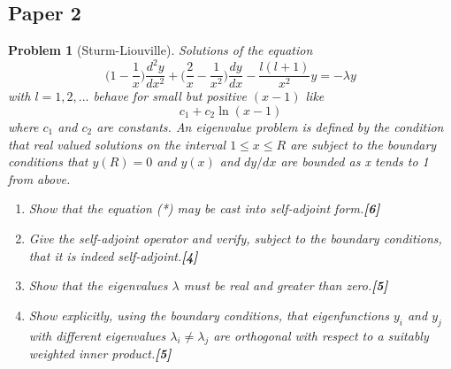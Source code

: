 \documentclass[a4paper]{article}
\theoremstyle{new}
\newtheorem{qns}{Problem}[section]
\begin{document}
\subsection{Paper 2}
\begin{qns}[Sturm-Liouville]
Solutions of the equation
\begin{equation}
    \bigg(1-\frac{1}{x}\bigg)\frac{d^2y}{dx^2}+\bigg(\frac{2}{x}-\frac{1}{x^2}\bigg)\frac{dy}{dx}-\frac{l(l+1)}{x^2}y=-\lambda y\tag{*}
\end{equation}
with $l = 1, 2, . . .$ behave for small but positive $(x − 1)$ like
$$c_1 + c_2\ln(x − 1)$$
where $c_1$ and $c_2$ are constants. An eigenvalue problem is defined by the condition that real valued solutions on the interval $1\leq x\leq R$ are subject to the boundary conditions that $y(R) = 0$ and $y(x)$ and $dy/dx$ are bounded as x tends to 1 from above.
\begin{enumerate}[label=(\roman*)]
    \item Show that the equation (*) may be cast into self-adjoint form.\hfill\textbf{[6]}
    \item Give the self-adjoint operator and verify, subject to the boundary conditions, that it is indeed self-adjoint.\hfill\textbf{[4]}
    \item Show that the eigenvalues $\lambda$ must be real and greater than zero.\hfill\textbf{[5]}
    \item Show explicitly, using the boundary conditions, that eigenfunctions $y_i$ and $y_j$ with different eigenvalues $\lambda_i\neq\lambda_j$ are orthogonal with respect to a suitably weighted inner product.\hfill\textbf{[5]}
\end{enumerate}
\end{qns}
\end{document}
